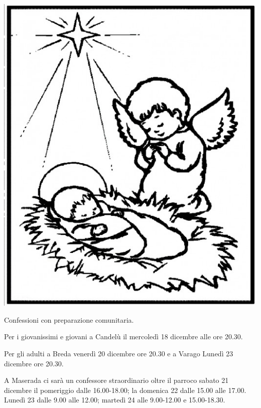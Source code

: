 \begin{center}
\vspace{1em}

\begin{minipage}{0.25\textwidth}
\includegraphics[width=\textwidth]{angolo.png}
\end{minipage}
\hfill
\begin{minipage}{0.72\textwidth}
Confessioni con preparazione comunitaria.

Per i giovanissimi e giovani a Candelù il mercoledì 18 dicembre alle ore 20.30.

Per gli adulti a Breda venerdì 20 dicembre ore 20.30 e a Varago Lunedì 23 dicembre ore 20.30.

A Maserada ci sarà un confessore straordinario oltre il parroco sabato 21 dicembre il  pomeriggio dalle 16.00-18.00; la domenica 22 dalle 15.00 alle 17.00. Lunedì 23 dalle 9.00 alle 12.00; martedì 24 alle 9.00-12.00 e 15.00-18.30.
\end{minipage}

\end{center}


\normalsize

